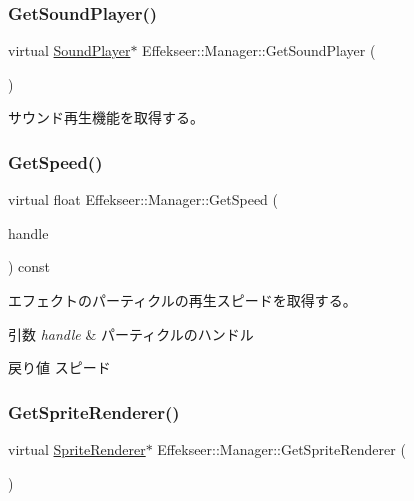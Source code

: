 \subsubsection{\texorpdfstring{Get\+Sound\+Player()}{GetSoundPlayer()}}
{\footnotesize\ttfamily virtual \mbox{\hyperlink{class_effekseer_1_1_sound_player}{Sound\+Player}}$\ast$ Effekseer\+::\+Manager\+::\+Get\+Sound\+Player (\begin{DoxyParamCaption}{ }\end{DoxyParamCaption})\hspace{0.3cm}{\ttfamily [pure virtual]}}



サウンド再生機能を取得する。 

\mbox{\label{class_effekseer_1_1_manager_ab42ee8a12f6c349af8bb658614d97489}} 
\subsubsection{\texorpdfstring{Get\+Speed()}{GetSpeed()}}
{\footnotesize\ttfamily virtual float Effekseer\+::\+Manager\+::\+Get\+Speed (\begin{DoxyParamCaption}\item[{\mbox{\hyperlink{namespace_effekseer_afba58b8d812da862190e9bbfc040824a}{Handle}}}]{handle }\end{DoxyParamCaption}) const\hspace{0.3cm}{\ttfamily [pure virtual]}}



エフェクトのパーティクルの再生スピードを取得する。 


\begin{DoxyParams}{引数}
{\em handle} & パーティクルのハンドル \\
\hline
\end{DoxyParams}
\begin{DoxyReturn}{戻り値}
スピード 
\end{DoxyReturn}
\mbox{\label{class_effekseer_1_1_manager_a64de7501affd3c08106b0442a4e2a76c}} 
\subsubsection{\texorpdfstring{Get\+Sprite\+Renderer()}{GetSpriteRenderer()}}
{\footnotesize\ttfamily virtual \mbox{\hyperlink{class_effekseer_1_1_sprite_renderer}{Sprite\+Renderer}}$\ast$ Effekseer\+::\+Manager\+::\+Get\+Sprite\+Renderer (\begin{DoxyParamCaption}{ }\end{DoxyParamCaption})\hspace{0.3cm}{\ttfamily [pure virtual]}}



